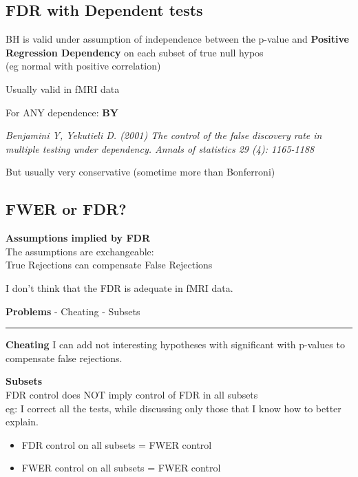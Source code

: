 \documentclass[]{article}
\providecommand{\tightlist}{%
  \setlength{\itemsep}{0pt}\setlength{\parskip}{0pt}}
\begin{document}
\subsection{FDR with Dependent tests}\label{fdr-with-dependent-tests}

BH is valid under assumption of independence between the p-value and
\textbf{Positive Regression Dependency} on each subset of true null
hypos\\
(eg normal with positive correlation)

Usually valid in fMRI data

For ANY dependence: \textbf{BY}

\emph{Benjamini Y, Yekutieli D. (2001) The control of the false
discovery rate in multiple testing under dependency. Annals of
statistics 29 (4): 1165-1188}

But usually very conservative (sometime more than Bonferroni)

\subsection{FWER or FDR?}\label{fwer-or-fdr}

\textbf{Assumptions implied by FDR}\\
The assumptions are exchangeable:\\
True Rejections can compensate False Rejections

I don't think that the FDR is adequate in fMRI data.

\textbf{Problems} - Cheating - Subsets

\begin{center}\rule{0.5\linewidth}{\linethickness}\end{center}

\textbf{Cheating} I can add not interesting hypotheses with significant
with p-values to compensate false rejections.

\textbf{Subsets}\\
FDR control does NOT imply control of FDR in all subsets\\
eg: I correct all the tests, while discussing only those that I know how
to better explain.

\begin{itemize}
\tightlist
\item
  FDR control on all subsets = FWER control
\item
  FWER control on all subsets = FWER control
\end{itemize}
\end{document}
